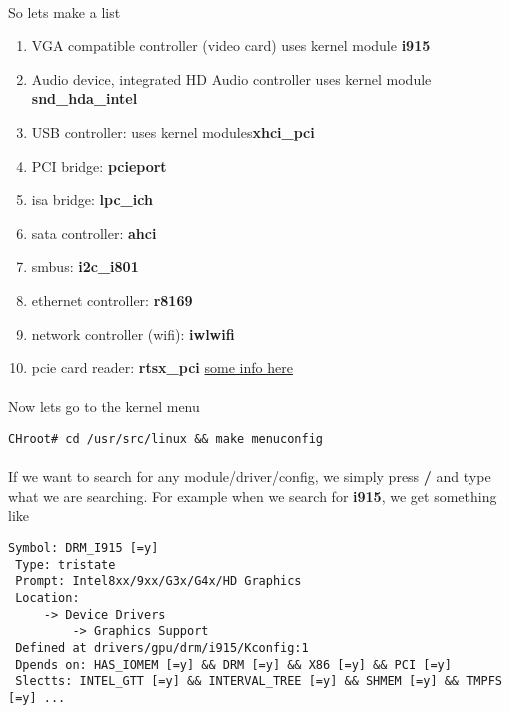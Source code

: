 \documentclass[10pt,a4paper]{article}
\begin{document}
                \paragraph{} So lets make a list
                \begin{enumerate}
                    \item VGA compatible controller (video card) uses kernel module \textbf{i915}
                    \item Audio device, integrated HD Audio controller uses kernel module \textbf{snd\_hda\_intel}
                    \item USB controller: uses kernel modules\textbf{xhci\_pci}
                    \item PCI bridge: \textbf{pcieport}
                    \item isa bridge: \textbf{lpc\_ich}
                    \item sata controller: \textbf{ahci}
                    \item smbus: \textbf{i2c\_i801}
                    \item ethernet controller: \textbf{r8169}
                    \item network controller (wifi): \textbf{iwlwifi}
                    \item pcie card reader: \textbf{rtsx\_pci} \href{https://wiki.gentoo.org/wiki/Lenovo_ThinkPad_T440s#Hardware_Status}{some info here}
                \end{enumerate}
                
                \paragraph{} Now lets go to the kernel menu
                
                \begin{lstlisting}[style=BashInputCHRoot]
 CHroot# cd /usr/src/linux && make menuconfig
                \end{lstlisting}
                
                \paragraph{} If we want to search for any module/driver/config, we simply press \textbf{/} and type what we are searching. For example when we search for \textbf{i915}, we get something like
                
                \begin{lstlisting}[style=KernelConfig]
 Symbol: DRM_I915 [=y]
 Type: tristate
 Prompt: Intel8xx/9xx/G3x/G4x/HD Graphics
 Location:
     -> Device Drivers
         -> Graphics Support
 Defined at drivers/gpu/drm/i915/Kconfig:1
 Dpends on: HAS_IOMEM [=y] && DRM [=y] && X86 [=y] && PCI [=y]
 Slectts: INTEL_GTT [=y] && INTERVAL_TREE [=y] && SHMEM [=y] && TMPFS [=y] ...
                \end{lstlisting}
                
\end{document}

